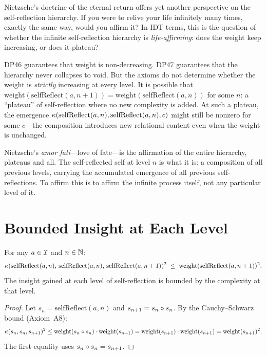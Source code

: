 Nietzsche's doctrine of the eternal return offers yet another perspective on
the self-reflection hierarchy.  If you were to relive your life infinitely
many times, exactly the same way, would you affirm it?  In IDT terms, this
is the question of whether the infinite self-reflection hierarchy is
\emph{life-affirming}: does the weight keep increasing, or does it plateau?

DP46 guarantees that weight is non-decreasing.  DP47 guarantees that the
hierarchy never collapses to void.  But the axioms do not determine whether
the weight is \emph{strictly} increasing at every level.  It is possible that
$\mathrm{weight}(\mathrm{selfReflect}(a, n+1)) =
\mathrm{weight}(\mathrm{selfReflect}(a, n))$ for some $n$: a ``plateau'' of
self-reflection where no new complexity is added.  At such a plateau, the
emergence $\kappa(\mathrm{selfReflect}(a,n), \mathrm{selfReflect}(a,n), c)$
might still be nonzero for some $c$---the composition introduces new relational
content even when the weight is unchanged.

Nietzsche's \emph{amor fati}---love of fate---is the affirmation of the entire
hierarchy, plateaus and all.  The self-reflected self at level $n$ is what it
is: a composition of all previous levels, carrying the accumulated emergence
of all previous self-reflections.  To affirm this is to affirm the infinite
process itself, not any particular level of it.

\section{Bounded Insight at Each Level}

\begin{theorem}
\label{thm:self-reflection-bounded}
For any $a \in \mathcal{I}$ and $n \in \mathbb{N}$:
\[
\kappa(\mathrm{selfReflect}(a,n),\, \mathrm{selfReflect}(a,n),\,
\mathrm{selfReflect}(a,n+1))^2
\;\leq\;
\mathrm{weight}(\mathrm{selfReflect}(a,n+1))^2.
\]
The insight gained at each level of self-reflection is bounded by the
complexity at that level.
\end{theorem}

\begin{proof}
Let $s_n = \mathrm{selfReflect}(a, n)$ and $s_{n+1} = s_n \circ s_n$.
By the Cauchy--Schwarz bound (Axiom~A8):
\[
\kappa(s_n, s_n, s_{n+1})^2
\leq \mathrm{weight}(s_n \circ s_n) \cdot \mathrm{weight}(s_{n+1})
= \mathrm{weight}(s_{n+1}) \cdot \mathrm{weight}(s_{n+1})
= \mathrm{weight}(s_{n+1})^2.
\]
The first equality uses $s_n \circ s_n = s_{n+1}$.
\end{proof}

